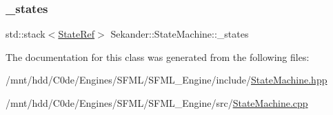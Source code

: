 \subsubsection{\texorpdfstring{\+\_\+states}{\_states}}
{\footnotesize\ttfamily std\+::stack$<$\hyperlink{namespaceSekander_a8503cedf9c863e9f6986eb29f2296f1a}{State\+Ref}$>$ Sekander\+::\+State\+Machine\+::\+\_\+states\hspace{0.3cm}{\ttfamily [private]}}



The documentation for this class was generated from the following files\+:\begin{DoxyCompactItemize}
\item 
/mnt/hdd/\+C0de/\+Engines/\+S\+F\+M\+L/\+S\+F\+M\+L\+\_\+\+Engine/include/\hyperlink{StateMachine_8hpp}{State\+Machine.\+hpp}\item 
/mnt/hdd/\+C0de/\+Engines/\+S\+F\+M\+L/\+S\+F\+M\+L\+\_\+\+Engine/src/\hyperlink{StateMachine_8cpp}{State\+Machine.\+cpp}\end{DoxyCompactItemize}
